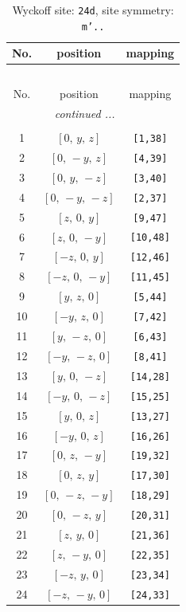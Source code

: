 \documentclass[fleqn,8pt]{jsarticle}
\begin{document}
\begin{longtable}{ccc}
\caption{Wyckoff site: {\tt 24d}, site symmetry: {\tt m'..}}
 \\
 \hline \hline
No. & position & mapping \\ \hline \endfirsthead

\multicolumn{2}{l}{\tablename\ \thetable{}} \\
 \hline \hline
No. & position & mapping \\ \hline \endhead

 \hline \hline
\multicolumn{2}{r}{\footnotesize\it continued ...} \\ \endfoot

 \hline \hline
\multicolumn{2}{r}{} \\ \endlastfoot

1 & $\left[ 0,\, y,\, z \right]$ & {\tt [1,38]} \\ \hline
2 & $\left[ 0,\, - y,\, z \right]$ & {\tt [4,39]} \\ \hline
3 & $\left[ 0,\, y,\, - z \right]$ & {\tt [3,40]} \\ \hline
4 & $\left[ 0,\, - y,\, - z \right]$ & {\tt [2,37]} \\ \hline
5 & $\left[ z,\, 0,\, y \right]$ & {\tt [9,47]} \\ \hline
6 & $\left[ z,\, 0,\, - y \right]$ & {\tt [10,48]} \\ \hline
7 & $\left[ - z,\, 0,\, y \right]$ & {\tt [12,46]} \\ \hline
8 & $\left[ - z,\, 0,\, - y \right]$ & {\tt [11,45]} \\ \hline
9 & $\left[ y,\, z,\, 0 \right]$ & {\tt [5,44]} \\ \hline
10 & $\left[ - y,\, z,\, 0 \right]$ & {\tt [7,42]} \\ \hline
11 & $\left[ y,\, - z,\, 0 \right]$ & {\tt [6,43]} \\ \hline
12 & $\left[ - y,\, - z,\, 0 \right]$ & {\tt [8,41]} \\ \hline
13 & $\left[ y,\, 0,\, - z \right]$ & {\tt [14,28]} \\ \hline
14 & $\left[ - y,\, 0,\, - z \right]$ & {\tt [15,25]} \\ \hline
15 & $\left[ y,\, 0,\, z \right]$ & {\tt [13,27]} \\ \hline
16 & $\left[ - y,\, 0,\, z \right]$ & {\tt [16,26]} \\ \hline
17 & $\left[ 0,\, z,\, - y \right]$ & {\tt [19,32]} \\ \hline
18 & $\left[ 0,\, z,\, y \right]$ & {\tt [17,30]} \\ \hline
19 & $\left[ 0,\, - z,\, - y \right]$ & {\tt [18,29]} \\ \hline
20 & $\left[ 0,\, - z,\, y \right]$ & {\tt [20,31]} \\ \hline
21 & $\left[ z,\, y,\, 0 \right]$ & {\tt [21,36]} \\ \hline
22 & $\left[ z,\, - y,\, 0 \right]$ & {\tt [22,35]} \\ \hline
23 & $\left[ - z,\, y,\, 0 \right]$ & {\tt [23,34]} \\ \hline
24 & $\left[ - z,\, - y,\, 0 \right]$ & {\tt [24,33]} \\
\end{longtable}
\end{document}
